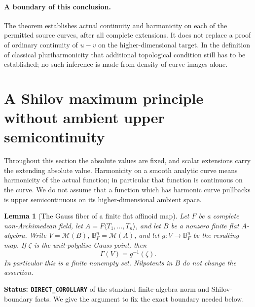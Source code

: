 \documentclass[11pt,a4paper]{article}
\numberwithin{equation}{section}
\newtheorem{lemma}[theorem]{Lemma}
\theoremstyle{definition}
\theoremstyle{remark}
\begin{document}
\paragraph{A boundary of this conclusion.}
The theorem establishes actual continuity and harmonicity on each
of the permitted source curves, after all complete extensions.
It does not replace a proof of ordinary continuity of $u-v$ on
the higher-dimensional target.  In the definition of classical
pluriharmonicity that additional topological condition still has
to be established; no such inference is made from density of
curve images alone.



\section{A Shilov maximum principle without ambient upper semicontinuity}
\label{sec:r5-shilov-without-usc}

Throughout this section the absolute values are fixed, and scalar
extensions carry the extending absolute value.  Harmonicity on a
smooth analytic curve means harmonicity of the actual function; in
particular that function is continuous on the curve.  We do not
assume that a function which has harmonic curve pullbacks is upper
semicontinuous on its higher-dimensional ambient space.

\begin{lemma}[The Gauss fiber of a finite flat affinoid map]
\label{lem:r5-finite-flat-gauss-shilov}
Let $F$ be a complete non-Archimedean field, let
$A=F\langle T_1,\ldots,T_n\rangle$, and let $B$ be a nonzero
finite flat $A$-algebra.  Write $V=\mathcal M(B)$,
$\mathbb B_F^n=\mathcal M(A)$, and let
$g:V\to\mathbb B_F^n$ be the resulting map.  If $\zeta$ is the
unit-polydisc Gauss point, then
\[
                         \Gamma(V)=g^{-1}(\zeta).
\]
In particular this is a finite nonempty set.  Nilpotents in $B$
do not change the assertion.
\end{lemma}

\noindent\textbf{Status: \texttt{DIRECT\_COROLLARY}} of the
standard finite-algebra norm and Shilov-boundary facts.  We give the
argument to fix the exact boundary needed below.
\end{document}
